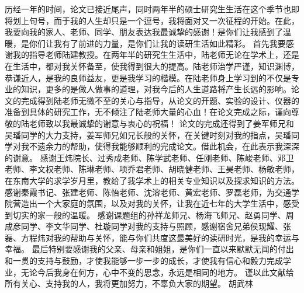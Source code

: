 历经一年的时间，论文已接近尾声，同时两年半的硕士研究生生活在这个季节也即将划上句号，而于我的人生却只是一个逗号，我将面对又一次征程的开始。在此，我要向我的家人、老师、同学、朋友表达我最诚挚的感谢！是你们让我感到了温暖，是你们让我有了前进的力量，是你们让我的读研生活如此精彩。
首先我要感谢我的指导老师陆建教授。在两年半的研究生生活中，陆老师无论在学术上，还是在生活中，都对我关怀备至，使我得到很大的提高。陆老师治学严谨，知识渊博，恭谦近人，是我的良师益友，更是我学习的楷模。在陆老师身上学习到的不仅是专业的知识，更多的是做人做事的道理，对我今后的人生道路将产生长远的影响。论文的完成得到陆老师无微不至的关心与指导，从论文的开题、实验的设计、仪器的准备到具体的研究工作，无不倾注了陆老师大量的心血！在论文完成之际，谨向尊敬的陆老师致以我最诚挚的谢意与衷心的祝福！
论文的完成还得到了姜军师兄和吴璠同学的大力支持，姜军师兄如兄长般的关怀，在关键时刻对我的指点，吴璠同学对我不遗余力的帮助，使得我能够顺利的完成论文。借此机会，在此表示我深深的谢意。
感谢王炜院长、过秀成老师、陈学武老师、任刚老师、陈峻老师、邓卫老师、李文权老师、陈琳老师、项乔君老师、胡晓健老师、王昊老师、杨敏老师，在东南大学的求学岁月里，教给了我学术上的相关专业知识以及探求知识的方法。
感谢秦霞书记、张建老师、陈怡老师、沈溶老师、黄宏老师、罗磊老师，为交通学院营造出一个大家庭的氛围，以及对我的关怀，让我在近七年的大学生活中，感受到切实的家一般的温暖。
感谢课题组的孙祥龙师兄、杨海飞师兄、赵勇同学、周成彦同学、李文华同学、杜璇同学对我的支持与照顾，感谢宿舍兄弟侯现耀、张磊、方程炜对我的帮助与关怀，能与你们共度这最美好的读研时光，是我的幸运与幸福。
最后特别要感谢我的父亲、母亲和姐姐，是你们一直以来默默无闻的付出和一贯的支持与鼓励，才使我能够一步一步的成长，才使我有信心和毅力完成学业，无论今后我身在何方，心中不变的思念，永远是相同的地方。
谨以此文献给所有关心、支持我的人，我将更加努力，不辜负大家的期望。
胡武林 
